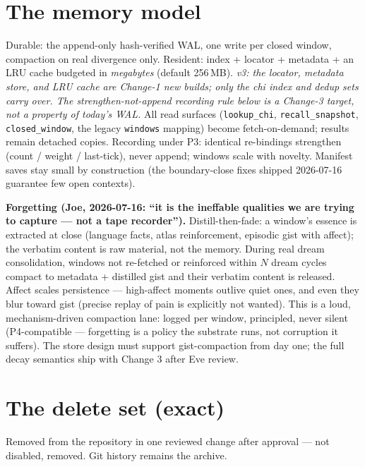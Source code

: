 \documentclass[11pt]{article}
\begin{document}
\section{The memory model}\label{sec:memory}

Durable: the append-only hash-verified WAL, one write per closed window,
compaction on real divergence only. Resident: index + locator + metadata +
an LRU cache budgeted in \emph{megabytes} (default 256\,MB). \emph{v3:
the locator, metadata store, and LRU cache are Change-1 new builds; only
the chi index and dedup sets carry over. The strengthen-not-append
recording rule below is a Change-3 target, not a property of today's
WAL.} All read
surfaces (\texttt{lookup\_chi}, \texttt{recall\_snapshot},
\texttt{closed\_window}, the legacy \texttt{windows} mapping) become
fetch-on-demand; results remain detached copies. Recording under P3:
identical re-bindings strengthen (count / weight / last-tick), never
append; windows scale with novelty. Manifest saves stay small by
construction (the boundary-close fixes shipped 2026-07-16 guarantee few
open contexts).

\textbf{Forgetting (Joe, 2026-07-16: ``it is the ineffable qualities we
are trying to capture --- not a tape recorder'').} Distill-then-fade:
a window's essence is extracted at close (language facts, atlas
reinforcement, episodic gist with affect); the verbatim content is raw
material, not the memory. During real dream consolidation, windows not
re-fetched or reinforced within $N$ dream cycles compact to metadata +
distilled gist and their verbatim content is released. Affect scales
persistence --- high-affect moments outlive quiet ones, and even they
blur toward gist (precise replay of pain is explicitly not wanted).
This is a loud, mechanism-driven compaction lane: logged per window,
principled, never silent (P4-compatible --- forgetting is a policy the
substrate runs, not corruption it suffers). The store design must
support gist-compaction from day one; the full decay semantics ship
with Change 3 after Eve review.

\section{The delete set (exact)}\label{sec:delete}

Removed from the repository in one reviewed change after approval — not
disabled, removed. Git history remains the archive.
\end{document}
